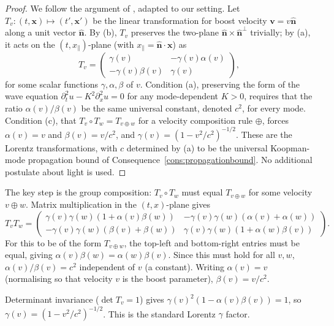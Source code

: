 \begin{proof}
We follow the argument of \citet{ignatowsky1910}, adapted to our setting. Let $T_{v}\colon(t,\mathbf{x})\mapsto(t',\mathbf{x}')$ be the linear transformation for boost velocity $\mathbf{v}=v\hat{\mathbf{n}}$ along a unit vector $\hat{\mathbf{n}}$. By (b), $T_{v}$ preserves the two-plane $\hat{\mathbf{n}}\times\hat{\mathbf{n}}^{\perp}$ trivially; by (a), it acts on the $(t,x_{\|})$-plane (with $x_{\|}=\hat{\mathbf{n}}\cdot\mathbf{x}$) as
\begin{equation*}
T_{v}=\begin{pmatrix}\gamma(v)&-\gamma(v)\alpha(v)\\-\gamma(v)\beta(v)&\gamma(v)\end{pmatrix},
\end{equation*}
for some scalar functions $\gamma,\alpha,\beta$ of $v$. Condition (a), preserving the form of the wave equation $\partial_{t}^{2}u-K^{2}\partial_{x}^{2}u=0$ for any mode-dependent $K>0$, requires that the ratio $\alpha(v)/\beta(v)$ be the same universal constant, denoted $c^{2}$, for every mode. Condition (c), that $T_{v}\circ T_{w}=T_{v\oplus w}$ for a velocity composition rule $\oplus$, forces $\alpha(v)=v$ and $\beta(v)=v/c^{2}$, and $\gamma(v)=(1-v^{2}/c^{2})^{-1/2}$. These are the Lorentz transformations, with $c$ determined by (a) to be the universal Koopman-mode propagation bound of Consequence~\ref{cons:propagationbound}. No additional postulate about light is used.
\end{proof}

\begin{remark}
The key step is the group composition: $T_{v}\circ T_{w}$ must equal $T_{v\oplus w}$ for some velocity $v\oplus w$. Matrix multiplication in the $(t,x)$-plane gives
\begin{equation*}
T_{v}T_{w}=\begin{pmatrix}\gamma(v)\gamma(w)(1+\alpha(v)\beta(w))&-\gamma(v)\gamma(w)(\alpha(v)+\alpha(w))\\-\gamma(v)\gamma(w)(\beta(v)+\beta(w))&\gamma(v)\gamma(w)(1+\alpha(w)\beta(v))\end{pmatrix}.
\end{equation*}
For this to be of the form $T_{v\oplus w}$, the top-left and bottom-right entries must be equal, giving $\alpha(v)\beta(w)=\alpha(w)\beta(v)$. Since this must hold for all $v,w$, $\alpha(v)/\beta(v)=c^{2}$ independent of $v$ (a constant). Writing $\alpha(v)=v$ (normalising so that velocity $v$ is the boost parameter), $\beta(v)=v/c^{2}$.

Determinant invariance ($\det T_{v}=1$) gives $\gamma(v)^{2}(1-\alpha(v)\beta(v))=1$, so $\gamma(v)=(1-v^{2}/c^{2})^{-1/2}$. This is the standard Lorentz $\gamma$ factor.
\end{remark}

